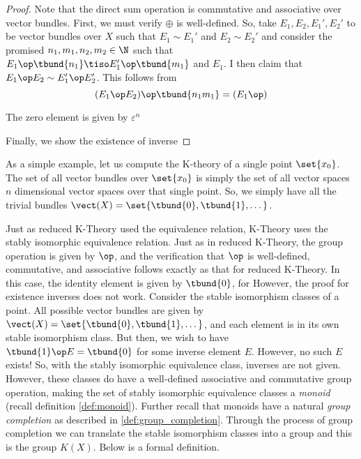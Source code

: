 \documentclass[../sean_thesis.tex]{subfiles}
\begin{document}
    \begin{proof}
        Note that the direct sum operation is commutative and associative over vector bundles. \toadd{}
        First, we must verify $\oplus$ is well-defined. So, take $E_1, E_2, E_1', E_2'$ to be vector bundles over $X$ such that $E_1 \sim E_1'$ and $E_2 \sim E_2'$ and consider the promised $n_1,m_1,n_2,m_2 \in \N$ such that $E_1 \op \tbund{n_1} \tiso E_1' \op \tbund{m_1}$ and $E_1$. I then claim that $E_1 \op E_2 \sim E_1' \op E_2'$. This follows from
       	\begin{equation*}
            (E_1 \op E_2) \op \tbund{n_1m_1} = (E_1 \op )
        \end{equation*}

        The zero element is given by $\varepsilon^n$ 

        Finally, we show the existence of inverse

    \end{proof}


    \begin{example}
        As a simple example, let us compute the K-theory of a single point $\set{x_0}$. The set of all vector bundles over $\set{x_0}$ is simply the set of all vector spaces $n$ dimensional vector spaces over that single point. So, we simply have all the trivial bundles $\vect(X) = \set{\tbund{0}, \tbund{1}, \dots}$. 
    \end{example}


Just as reduced K-Theory used the  equivalence relation, K-Theory uses the stably isomorphic equivalence relation. Just as in reduced K-Theory, the group operation is given by $\op$, and the verification that $\op$ is well-defined, commutative, and associative follows exactly as that for reduced K-Theory. In this case, the identity element is given by $\tbund{0}$, for 
\toadd{}
However, the proof for existence inverses does not work. Consider the stable isomorphism classes of a point. All possible vector bundles are given by $\vect(X) = \set{\tbund{0},\tbund{1}, \dots}$, and each element is in its own stable isomorphism class. But then, we wish to have $\tbund{1} \op E = \tbund{0}$ for some inverse element $E$. However, no such $E$ exists! So, with the stably isomorphic equivalence class, inverses are not given. However, these classes do have a well-defined associative and commutative group operation, making the set of stably isomorphic equivalence classes a \emph{monoid} (recall definition \ref{def:monoid}). Further recall that monoids have a natural \emph{group completion} as described in \ref{def:group_completion}. Through the process of group completion we can translate the stable isomorphism classes into a group and this is the group $K(X)$. Below is a formal definition.
\end{document}
